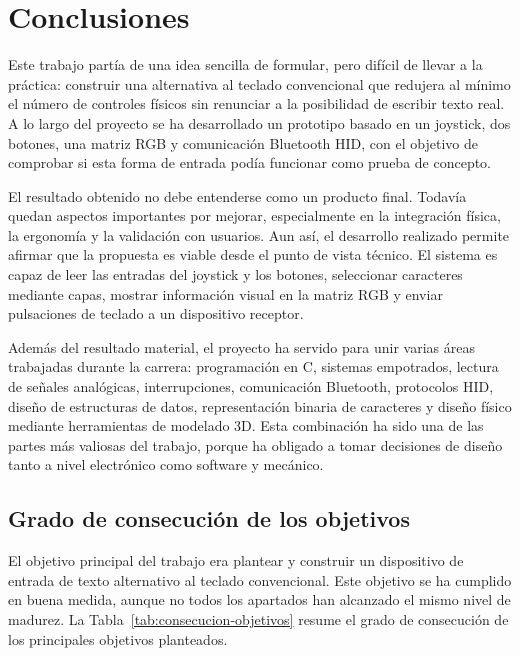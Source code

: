 \chapter{Conclusiones}
\label{ch:conclusiones}

Este trabajo partía de una idea sencilla de formular, pero difícil de llevar a la práctica: construir una alternativa al teclado convencional que redujera al mínimo el número de controles físicos sin renunciar a la posibilidad de escribir texto real. A lo largo del proyecto se ha desarrollado un prototipo basado en un joystick, dos botones, una matriz RGB y comunicación Bluetooth HID, con el objetivo de comprobar si esta forma de entrada podía funcionar como prueba de concepto.

El resultado obtenido no debe entenderse como un producto final. Todavía quedan aspectos importantes por mejorar, especialmente en la integración física, la ergonomía y la validación con usuarios. Aun así, el desarrollo realizado permite afirmar que la propuesta es viable desde el punto de vista técnico. El sistema es capaz de leer las entradas del joystick y los botones, seleccionar caracteres mediante capas, mostrar información visual en la matriz RGB y enviar pulsaciones de teclado a un dispositivo receptor.

Además del resultado material, el proyecto ha servido para unir varias áreas trabajadas durante la carrera: programación en C, sistemas empotrados, lectura de señales analógicas, interrupciones, comunicación Bluetooth, protocolos HID, diseño de estructuras de datos, representación binaria de caracteres y diseño físico mediante herramientas de modelado 3D. Esta combinación ha sido una de las partes más valiosas del trabajo, porque ha obligado a tomar decisiones de diseño tanto a nivel electrónico como software y mecánico.

\section{Grado de consecución de los objetivos}
\label{sec:consecucion-objetivos}

El objetivo principal del trabajo era plantear y construir un dispositivo de entrada de texto alternativo al teclado convencional. Este objetivo se ha cumplido en buena medida, aunque no todos los apartados han alcanzado el mismo nivel de madurez. La Tabla~\ref{tab:consecucion-objetivos} resume el grado de consecución de los principales objetivos planteados.

